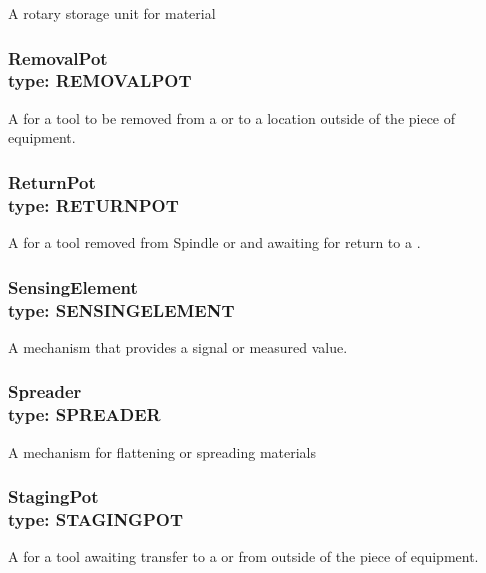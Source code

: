 A rotary storage unit for material


\subsubsection[RemovalPot]{RemovalPot \\ {\small type: REMOVAL\textunderscore POT}}
\label{sec:RemovalPot}



A  for a tool to be removed from a  or  to a location outside of the piece of equipment.


\subsubsection[ReturnPot]{ReturnPot \\ {\small type: RETURN\textunderscore POT}}
\label{sec:ReturnPot}



A  for a tool removed from \gls{Spindle} or  and awaiting for return to a .


\subsubsection[SensingElement]{SensingElement \\ {\small type: SENSING\textunderscore ELEMENT}}
\label{sec:SensingElement}



A mechanism that provides a signal or measured value.


\subsubsection[Spreader]{Spreader \\ {\small type: SPREADER}}
\label{sec:Spreader}



A mechanism for flattening or spreading materials


\subsubsection[StagingPot]{StagingPot \\ {\small type: STAGING\textunderscore POT}}
\label{sec:StagingPot}



A  for a tool awaiting transfer to a  or  from outside of the piece of equipment.


